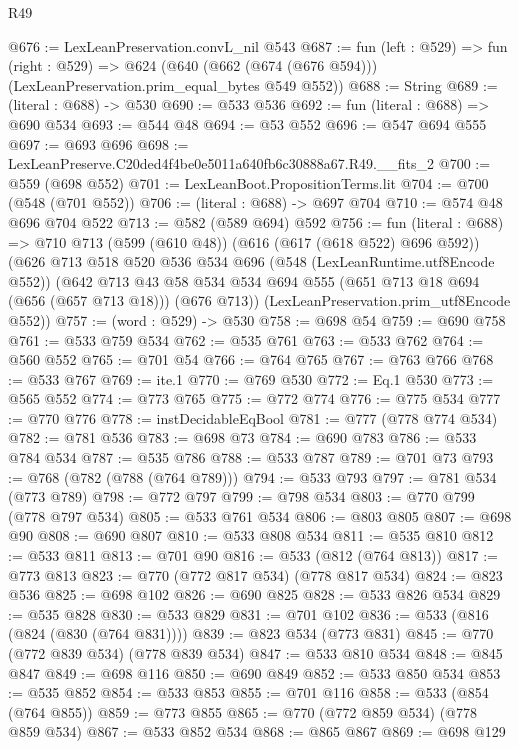 \begin{lexlean}{R49}
\begin{coremodule}
@676 := LexLeanPreservation.convL_nil @543
@687 := fun (left : @529) =>
  fun (right : @529) =>
  @624 (@640 (@662 (@674 (@676 @594))) (LexLeanPreservation.prim_equal_bytes @549 @552))
@688 := String
@689 := (literal : @688) -> @530
@690 := @533 @536
@692 := fun (literal : @688) => @690 @534
@693 := @544 @48
@694 := @53 @552
@696 := @547 @694 @555
@697 := @693 @696
@698 := LexLeanPreserve.C20ded4f4be0e5011a640fb6c30888a67.R49.__fits_2
@700 := @559 (@698 @552)
@701 := LexLeanBoot.PropositionTerms.lit
@704 := @700 (@548 (@701 @552))
@706 := (literal : @688) -> @697 @704
@710 := @574 @48 @696 @704 @522
@713 := @582 (@589 @694) @592
@756 := fun (literal : @688) =>
  @710
    @713
    (@599 (@610 @48))
    (@616 (@617 (@618 @522) @696 @592))
    (@626
      @713
      @518
      @520
      @536
      @534
      @696
      (@548 (LexLeanRuntime.utf8Encode @552))
      (@642
        @713
        @43
        @58
        @534
        @534
        @694
        @555
        (@651 @713 @18 @694 (@656 (@657 @713 @18)))
        (@676 @713))
      (LexLeanPreservation.prim_utf8Encode @552))
@757 := (word : @529) -> @530
@758 := @698 @54
@759 := @690 @758
@761 := @533 @759 @534
@762 := @535 @761
@763 := @533 @762
@764 := @560 @552
@765 := @701 @54
@766 := @764 @765
@767 := @763 @766
@768 := @533 @767
@769 := ite.{1}
@770 := @769 @530
@772 := Eq.{1} @530
@773 := @565 @552
@774 := @773 @765
@775 := @772 @774
@776 := @775 @534
@777 := @770 @776
@778 := instDecidableEqBool
@781 := @777 (@778 @774 @534)
@782 := @781 @536
@783 := @698 @73
@784 := @690 @783
@786 := @533 @784 @534
@787 := @535 @786
@788 := @533 @787
@789 := @701 @73
@793 := @768 (@782 (@788 (@764 @789)))
@794 := @533 @793
@797 := @781 @534 (@773 @789)
@798 := @772 @797
@799 := @798 @534
@803 := @770 @799 (@778 @797 @534)
@805 := @533 @761 @534
@806 := @803 @805
@807 := @698 @90
@808 := @690 @807
@810 := @533 @808 @534
@811 := @535 @810
@812 := @533 @811
@813 := @701 @90
@816 := @533 (@812 (@764 @813))
@817 := @773 @813
@823 := @770 (@772 @817 @534) (@778 @817 @534)
@824 := @823 @536
@825 := @698 @102
@826 := @690 @825
@828 := @533 @826 @534
@829 := @535 @828
@830 := @533 @829
@831 := @701 @102
@836 := @533 (@816 (@824 (@830 (@764 @831))))
@839 := @823 @534 (@773 @831)
@845 := @770 (@772 @839 @534) (@778 @839 @534)
@847 := @533 @810 @534
@848 := @845 @847
@849 := @698 @116
@850 := @690 @849
@852 := @533 @850 @534
@853 := @535 @852
@854 := @533 @853
@855 := @701 @116
@858 := @533 (@854 (@764 @855))
@859 := @773 @855
@865 := @770 (@772 @859 @534) (@778 @859 @534)
@867 := @533 @852 @534
@868 := @865 @867
@869 := @698 @129

\end{coremodule}
\end{lexlean}
